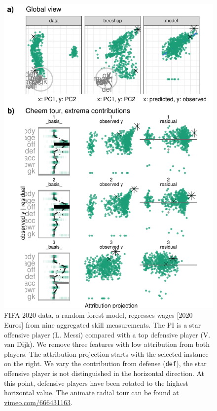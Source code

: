\documentclass[
]{article}
\begin{document}
\begin{figure}

{\centering \includegraphics[width=1\linewidth]{./figures/case_fifa} 

}

\caption{FIFA 2020 data, a random forest model, regresses wages {[}2020 Euros{]} from nine aggregated skill measurements. The PI is a star offensive player (L. Messi) compared with a top defensive player (V. van Dijk). We remove three features with low attribution from both players. The attribution projection starts with the selected instance on the right. We vary the contribution from defense (\texttt{def}), the star offensive player is not distinguished in the horizontal direction. At this point, defensive players have been rotated to the highest horizontal value. The animate radial tour can be found at \href{https://vimeo.com/666431163}{vimeo.com/666431163}.}\label{fig:casefifa}
\end{figure}
\end{document}
